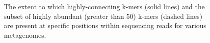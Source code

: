 \documentclass[10pt]{article}
\begin{document}
\begin{figure}
\caption{The extent to which highly-connecting k-mers (solid lines) and the subset of highly abundant (greater than 50) k-mers (dashed lines) are present at specific positions within sequencing reads for various metagenomes.}
\end{figure}
\end{document}
